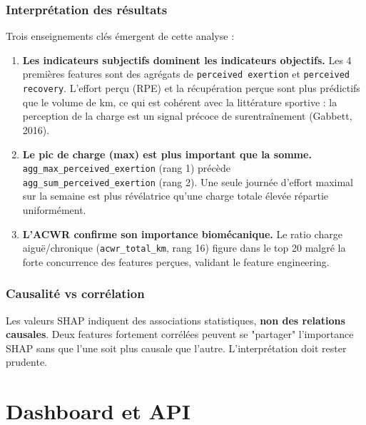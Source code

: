 \documentclass[12pt,a4paper]{report}
\begin{document}
\subsection{Interprétation des résultats}

Trois enseignements clés émergent de cette analyse :

\begin{enumerate}
  \item \textbf{Les indicateurs subjectifs dominent les indicateurs objectifs.}
        Les 4 premières features sont des agrégats de \texttt{perceived exertion} et
        \texttt{perceived recovery}. L'effort perçu (RPE) et la récupération perçue sont
        plus prédictifs que le volume de km, ce qui est cohérent avec la littérature sportive :
        la perception de la charge est un signal précoce de surentraînement (Gabbett, 2016).

  \item \textbf{Le pic de charge (max) est plus important que la somme.}
        \texttt{agg\_max\_perceived\_exertion} (rang 1) précède \texttt{agg\_sum\_perceived\_exertion}
        (rang 2). Une seule journée d'effort maximal sur la semaine est plus révélatrice qu'une
        charge totale élevée répartie uniformément.

  \item \textbf{L'ACWR confirme son importance biomécanique.}
        Le ratio charge aiguë/chronique (\texttt{acwr\_total\_km}, rang 16) figure dans le
        top 20 malgré la forte concurrence des features perçues, validant le feature engineering.
\end{enumerate}

\subsection{Causalité vs corrélation}

\begin{warningbox}[title=Limite importante]
Les valeurs SHAP indiquent des associations statistiques, \textbf{non des relations causales}.
Deux features fortement corrélées peuvent se "partager" l'importance SHAP sans que l'une
soit plus causale que l'autre. L'interprétation doit rester prudente.
\end{warningbox}

\chapter{Dashboard et API}
\end{document}
